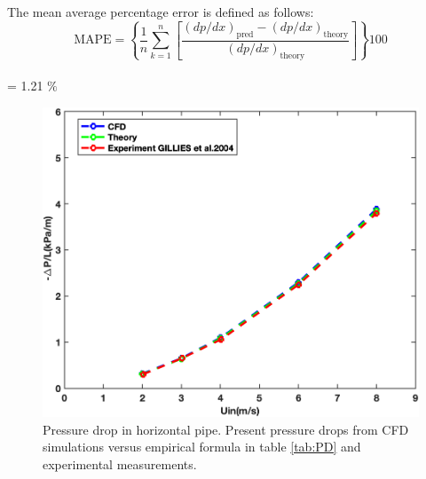 \documentclass[review,3p,times,12pt]{elsarticle}
\begin{document}
\vspace{-2cm}\begin{minipage}[t]{0.45\textwidth}
\vspace{2.5cm}
The mean average percentage error is defined as follows:
\footnotesize{$$
\text{MAPE}=\left\{\frac{1}{n} \sum_{k=1}^{n}\left[\frac{(d p / d x)_{\text{pred}}-(d p / d x)_{\text{theory} }}{(d p / d x)_{\text{theory}}}\right]\right\} 100
$$\\
 = 1.21 $\%$}
\end{minipage} \hfill 
\begin{minipage}[t]{0.55\textwidth}
\begin{figure}[H]
\begin{center}
\includegraphics[scale = 0.45]{WH}
\caption{ Pressure drop in horizontal pipe. 
Present pressure drops from CFD simulations versus empirical formula in table \ref{tab:PD} and experimental measurements.}\label{horiz:theo}
\end{center}
\end{figure}
\end{minipage}\\
\end{document}
